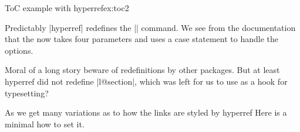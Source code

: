 \begin{texexample}{ToC example with hyperref}{ex:toc2}
%
\end{texexample}

Predictably |hyperref| redefines the |\contentsline| command. We see from the documentation that 
the  now takes four parameters and uses a case statement to handle the options.
\begin{teXXX}
\def\contentsline#1#2#3#4{%
  \ifx\\#4\\%
    	\csname l@#1\endcsname{#2}{#3}%
  \else
 	\ifcase\Hy@linktoc %
 		\csname l@#1\endcsname{#2}{#3}%
 	\or %
 		\csname l@#1\endcsname{%
  	   \hyper@linkstart{link}{#4}{#2}\hyper@linkend
    	}{#3}%
  	 \or %
		\csname l@#1\endcsname{{#2}}{%
    	\hyper@linkstart{link}{#4}{#3}\hyper@linkend
    	}%
 	\else %
 		\csname l@#1\endcsname{%
 	\hyper@linkstart{link}{#4}{#2}\hyper@linkend
 	}{%
 	\hyper@linkstart{link}{#4}{#3}\hyper@linkend
 	}%
 	\fi
 \fi
}
\end{teXXX}

%

Moral of a long story beware of redefinitions by other packages. But at least hyperref did not redefine |l@section|,
which was left for us to use as a hook for typesetting? 

As we get many variations as to how the links are styled by hyperref
Here is a minimal how to set it.

